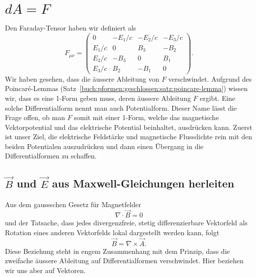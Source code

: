 \section{$dA = F$
	\label{maxwell:section:dA}}
Den Faraday-Tensor haben wir definiert als
\begin{equation}
	F_{\mu\nu} = \begin{pmatrix}
		0 & -E_1/c & -E_2/c & -E_3/c \\ E_1/c & 0 & B_3 & -B_2 \\ E_2/c & -B_3 & 0 & B_1 \\ E_3/c & B_2 & -B_1 & 0 
	\end{pmatrix}.
	\label{maxwell:section:dA:Faraday-Tensor}
\end{equation}
Wir haben gesehen, dass die äussere Ableitung von $F$ verschwindet.
Aufgrund des Poincaré-Lemmas (Satz~\ref{buch:pformen:geschlossen:satz:poincare-lemma}) wissen wir, dass es eine 1-Form geben muss, deren äussere Ableitung $F$ ergibt.
%
Eine solche Differentialform nennt man auch Potentialform.
%
Dieser Name lässt die Frage offen, ob man $F$ somit mit einer 1-Form, welche das magnetische Vektorpotential und das elektrische Potential beinhaltet, ausdrücken kann.
Zuerst ist unser Ziel, die elektrische Feldstärke und magnetische Flussdichte rein mit den beiden Potentialen auszudrücken und dann einen Übergang in die Differentialformen zu schaffen. 

\subsection{$\vec{B}$ und $\vec{E}$ aus Maxwell-Gleichungen herleiten}
Aus dem gaussschen Gesetz für Magnetfelder
\begin{equation*}
	\nabla \cdot \vec{B} = 0
\end{equation*}
und der Tatsache, dass jedes divergenzfreie, stetig differenzierbare Vektorfeld als Rotation eines anderen Vektorfelds lokal dargestellt werden kann,
folgt
\begin{equation}
	\label{maxwell:dA;rotA}
	\vec{B} = \nabla \times \vec{A}.
\end{equation}
Diese Beziehung steht in engem Zusammenhang mit dem Prinzip, dass die zweifache äussere Ableitung auf Differentialformen verschwindet. Hier beziehen wir uns aber auf Vektoren.

